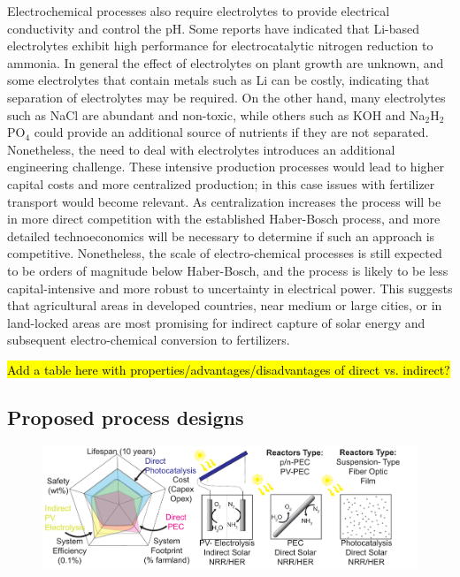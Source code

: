 Electrochemical processes also require electrolytes to provide electrical conductivity and control the pH. Some reports have indicated that Li-based electrolytes exhibit high performance for electrocatalytic nitrogen reduction to ammonia\cite{Song_2018,Mikosch_2005}. In general the effect of electrolytes on plant growth are unknown, and some electrolytes that contain metals such as Li can be costly, indicating that separation of electrolytes may be required. On the other hand, many electrolytes such as NaCl are abundant and non-toxic, while others such as KOH and Na$_2$H$_2$PO$_4$ could provide an additional source of nutrients if they are not separated. Nonetheless, the need to deal with electrolytes introduces an additional engineering challenge. These intensive production processes would lead to higher capital costs and more centralized production; in this case issues with fertilizer transport would become relevant. As centralization increases the process will be in more direct competition with the established Haber-Bosch process, and more detailed technoeconomics will be necessary to determine if such an approach is competitive. Nonetheless, the scale of electro-chemical processes is still expected to be orders of magnitude below Haber-Bosch, and the process is likely to be less capital-intensive and more robust to uncertainty in electrical power. This suggests that agricultural areas in developed countries, near medium or large cities, or in land-locked areas are most promising for indirect capture of solar energy and subsequent electro-chemical conversion to fertilizers.

\hl{Add a table here with properties/advantages/disadvantages of direct vs. indirect?}

\subsection{Proposed process designs}

\begin{figure}
    \centering
    \includegraphics[width=1\textwidth]{Figures/Systems.pdf}
    \caption{}
    \label{fig:systems}
\end{figure}


